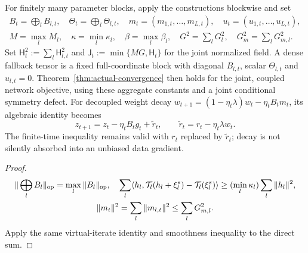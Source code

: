 \begin{corollary}
\label{cor:actual-network}
For finitely many parameter blocks, apply the constructions blockwise and set
\begin{gather}
 B_t=\bigoplus_lB_{l,t},\quad\Theta_t=\bigoplus_l\Theta_{l,t},\quad
 m_t=(m_{1,t},\ldots,m_{L,t}),\quad u_t=(u_{1,t},\ldots,u_{L,t}),\\
 M=\max_lM_l,\quad\kappa=\min_l\kappa_l,\quad
 \beta=\max_l\beta_l,\quad G^2=\sum_lG_l^2,\quad G_m^2=\sum_lG_{m,l}^2.
\end{gather}
Set $\mathsf H_t^2:=\sum_l\mathsf H_{l,t}^2$ and
$\mathsf J_t:=\min\{MG,\mathsf H_t\}$ for the joint normalized field.
A dense fallback tensor is a fixed full-coordinate block with diagonal
$B_{l,t}$, scalar $\Theta_{l,t}$ and $u_{l,t}=0$. Theorem~\ref{thm:actual-convergence}
then holds for the joint, coupled network objective, using these aggregate
constants and a joint conditional symmetry defect. For decoupled weight decay
$w_{t+1}=(1-\eta_t\lambda)w_t-\eta_tB_tm_t$, its algebraic identity becomes
\begin{equation}
 z_{t+1}=z_t-\eta_tB_tg_t+\widetilde r_t,\qquad
 \widetilde r_t=r_t-\eta_t\lambda w_t.
\end{equation}
The finite-time inequality remains valid with $r_t$ replaced by
$\widetilde r_t$; decay is not silently absorbed into an unbiased data gradient.
\end{corollary}
\begin{proof}
\begin{gather}
 \|\bigoplus_lB_l\|_{\mathrm{op}}=\max_l\|B_l\|_{\mathrm{op}},\quad
 \sum_l\langle h_l,\mathcal T_l(h_l+\xi_l^s)-\mathcal T_l(\xi_l^s)\rangle
 \ge(\min_l\kappa_l)\sum_l\|h_l\|^2,\\
 \|m_t\|^2=\sum_l\|m_{l,t}\|^2\le\sum_lG_{m,l}^2.
\end{gather}
Apply the same virtual-iterate identity and smoothness inequality to the direct sum.
\end{proof}
